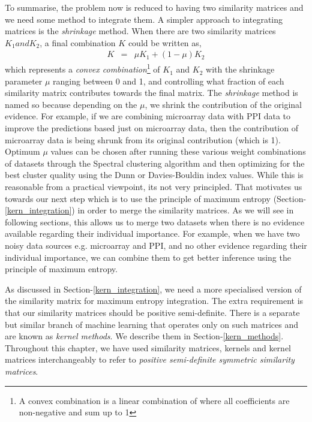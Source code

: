 To summarise, the problem now is reduced to having two similarity matrices and we need some method to integrate them. A simpler approach to integrating matrices is the \textit{shrinkage} method. When there are two similarity matrices $K_{1} and K_{2}$, a final combination $K$ could be written as,
\begin{eqnarray}
K &=& \mu K_{1}+(1-\mu)K_{2}
\end{eqnarray}
which represents a \textit{convex combination}\footnote{A convex combination is a linear combination of where all coefficients are non-negative and sum up to 1} of $K_{1}$ and $K_{2}$ with the shrinkage parameter $\mu$ ranging between 0 and 1, and controlling what fraction of each similarity matrix contributes towards the final matrix. The \textit{shrinkage} method is named so because depending on the $\mu$, we shrink the contribution of the original evidence. For example, if we are combining microarray data with \ac{PPI} data to improve the predictions based just on microarray data, then the contribution of microarray data is being shrunk from its original contribution (which is 1). Optimum $\mu$ values can be chosen after running these various weight combinations of datasets through the Spectral clustering algorithm and then optimizing for the best cluster quality using the Dunn or Davies-Bouldin index values. While this is reasonable from a practical viewpoint, its not very principled. That motivates us towards our next step which is to use the principle of maximum entropy (Section-\ref{kern_integration}) in order to merge the similarity matrices. As we will see in following sections, this allows us to merge two datasets when there is no evidence available regarding their individual importance. For example, when we have two noisy data sources e.g. microarray and \ac{PPI}, and no other evidence regarding their individual importance, we can combine them to get better inference using the principle of maximum entropy.

As discussed in Section-\ref{kern_integration}, we need a more specialised version of the similarity matrix for maximum entropy integration. The extra requirement is that 
our similarity matrices should be positive semi-definite. There is a separate but similar branch of machine learning that operates only on such matrices and are 
known as \textit{kernel methods}. We describe them in Section-\ref{kern_methods}. Throughout this chapter, we have used similarity matrices, kernels and kernel 
matrices interchangeably to refer to \textit{positive semi-definite symmetric similarity matrices}.

